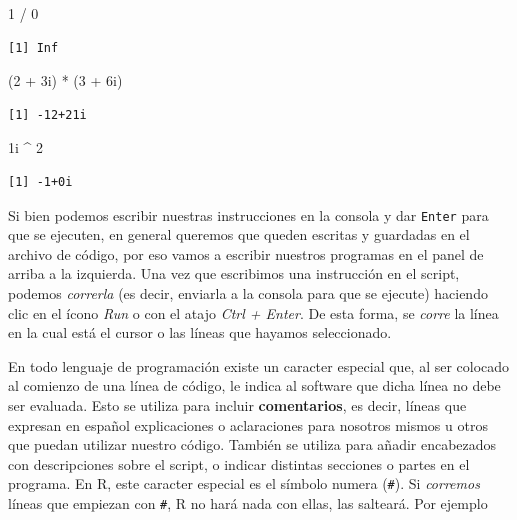 \documentclass[
]{book}
\newenvironment{Shaded}{\begin{snugshade}}{\end{snugshade}}
\newcommand{\DecValTok}[1]{\textcolor[rgb]{0.00,0.00,0.81}{#1}}
\newcommand{\NormalTok}[1]{#1}
\newcommand{\SpecialCharTok}[1]{\textcolor[rgb]{0.00,0.00,0.00}{#1}}
\begin{document}
\begin{Shaded}
\begin{Highlighting}[]
\DecValTok{1} \SpecialCharTok{/} \DecValTok{0}
\end{Highlighting}
\end{Shaded}

\begin{verbatim}
[1] Inf
\end{verbatim}

\begin{Shaded}
\begin{Highlighting}[]
\NormalTok{(}\DecValTok{2} \SpecialCharTok{+}\NormalTok{ 3i) }\SpecialCharTok{*}\NormalTok{ (}\DecValTok{3} \SpecialCharTok{+}\NormalTok{ 6i)}
\end{Highlighting}
\end{Shaded}

\begin{verbatim}
[1] -12+21i
\end{verbatim}

\begin{Shaded}
\begin{Highlighting}[]
\NormalTok{1i }\SpecialCharTok{\^{}} \DecValTok{2}
\end{Highlighting}
\end{Shaded}

\begin{verbatim}
[1] -1+0i
\end{verbatim}

Si bien podemos escribir nuestras instrucciones en la consola y dar \texttt{Enter} para que se ejecuten, en general queremos que queden escritas y guardadas en el archivo de código, por eso vamos a escribir nuestros programas en el panel de arriba a la izquierda. Una vez que escribimos una instrucción en el script, podemos \emph{correrla} (es decir, enviarla a la consola para que se ejecute) haciendo clic en el ícono \emph{Run} o con el atajo \emph{Ctrl + Enter}. De esta forma, se \emph{corre} la línea en la cual está el cursor o las líneas que hayamos seleccionado.

En todo lenguaje de programación existe un caracter especial que, al ser colocado al comienzo de una línea de código, le indica al software que dicha línea no debe ser evaluada. Esto se utiliza para incluir \textbf{comentarios}, es decir, líneas que expresan en español explicaciones o aclaraciones para nosotros mismos u otros que puedan utilizar nuestro código. También se utiliza para añadir encabezados con descripciones sobre el script, o indicar distintas secciones o partes en el programa. En R, este caracter especial es el símbolo numera (\texttt{\#}). Si \emph{corremos} líneas que empiezan con \texttt{\#}, R no hará nada con ellas, las salteará. Por ejemplo
\end{document}
